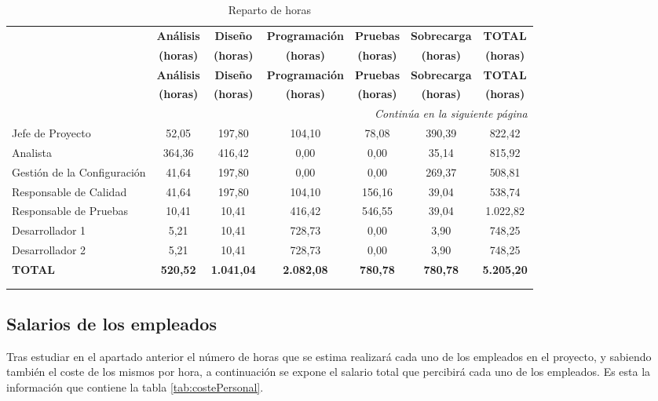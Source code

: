 \begin{center}
\begin{longtable}{lcccccc}

& \textbf{Análisis}	&	\textbf{Diseño}	&	\textbf{Programación}	&	\textbf{Pruebas}	&	\textbf{Sobrecarga}	&	\textbf{TOTAL} \\
& \textbf{(horas)}	&	\textbf{(horas)}	&	\textbf{(horas)}	&	\textbf{(horas)}	&	\textbf{(horas)}	&	\textbf{(horas)} \\
\hline
\hline
\endfirsthead
& \textbf{Análisis}	&	\textbf{Diseño}	&	\textbf{Programación}	&	\textbf{Pruebas}	&	\textbf{Sobrecarga}	&	\textbf{TOTAL} \\
& \textbf{(horas)}	&	\textbf{(horas)}	&	\textbf{(horas)}	&	\textbf{(horas)}	&	\textbf{(horas)}	&	\textbf{(horas)} \\
\hline
\hline
\endhead

\hline \multicolumn{7}{r}{\textit{Continúa en la siguiente página}} \\
\endfoot
\endlastfoot

Jefe de Proyecto	&	52,05	&	197,80	&	104,10	&	78,08	&	390,39	&	822,42	\\
Analista	&	364,36	&	416,42	&	0,00	&	0,00	&	35,14	&	815,92	\\
Gestión de la Configuración	&	41,64	&	197,80	&	0,00	&	0,00	&	269,37	&	508,81	\\
Responsable de Calidad	&	41,64	&	197,80	&	104,10	&	156,16	&	39,04	&	538,74	\\
Responsable de Pruebas	&	10,41	&	10,41	&	416,42	&	546,55	&	39,04	&	1.022,82	\\
Desarrollador 1 &	5,21	&	10,41	&	728,73	&	0,00	&	3,90	&	748,25	\\
Desarrollador 2	&	5,21	&	10,41	&	728,73	&	0,00	&	3,90	&	748,25	\\	\hline \hline
\textbf{TOTAL}	&	\textbf{520,52}	&	\textbf{1.041,04}	&	\textbf{2.082,08}	&	\textbf{780,78}	&\textbf{780,78}	&	\textbf{5.205,20}	\\	\hline

\caption{Reparto de horas}\\
\label{tab:repHoras}
\end{longtable}
\end{center}




\subsection{Salarios de los empleados}
\par Tras estudiar en el apartado anterior el número de horas que se estima realizará cada uno de los empleados en el proyecto, y sabiendo también el coste de los mismos por hora, a continuación se expone el salario total que percibirá cada uno de los empleados. Es esta la información que contiene la tabla \ref{tab:costePersonal}.

